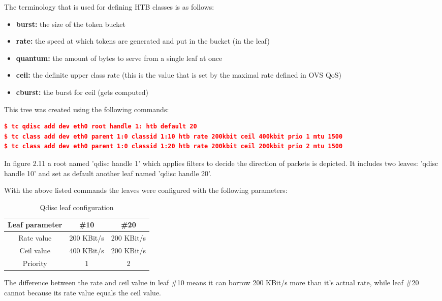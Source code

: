 The terminology that is used for defining HTB classes is as follows:
\begin{itemize}
\item \textbf{burst:} the size of the token bucket
\item \textbf{rate:} the speed at which tokens are generated and put in the bucket (in the leaf)
\item \textbf{quantum:} the amount of bytes to serve from a single leaf at once
\item \textbf{ceil:} the definite upper class rate (this is the value that is set by the maximal rate defined in OVS QoS)
\item \textbf{cburst:} the burst for ceil (gets computed)
\end{itemize}

This tree was created using the following commands:
\begin{lstlisting}[language=json]
$ tc qdisc add dev eth0 root handle 1: htb default 20
$ tc class add dev eth0 parent 1:0 classid 1:10 htb rate 200kbit ceil 400kbit prio 1 mtu 1500
$ tc class add dev eth0 parent 1:0 classid 1:20 htb rate 200kbit ceil 200kbit prio 2 mtu 1500
\end{lstlisting}

In figure 2.11 a root named 'qdisc handle 1' which applies filters to decide the direction of packets is depicted. It includes two leaves: 'qdisc handle 10' and set as default another leaf named 'qdisc handle 20'.

With the above listed commands the leaves were configured with the following parameters:

\begin{table}[H]
\centering

\begin{tabular}{|c|c|c|}
\hline Leaf parameter & \#10 & \#20 \\ 
\hline Rate value & 200 KBit/s & 200 KBit/s \\ 
\hline Ceil value & 400 KBit/s & 200 KBit/s \\ 
\hline Priority & 1 & 2 \\ 
\hline 
\end{tabular} 

\caption{Qdisc leaf configuration}
\end{table}

The difference between the rate and ceil value in leaf \#10 means it can borrow 200 KBit/s more than it's actual rate, while leaf \#20 cannot because its rate value equals the ceil value.

